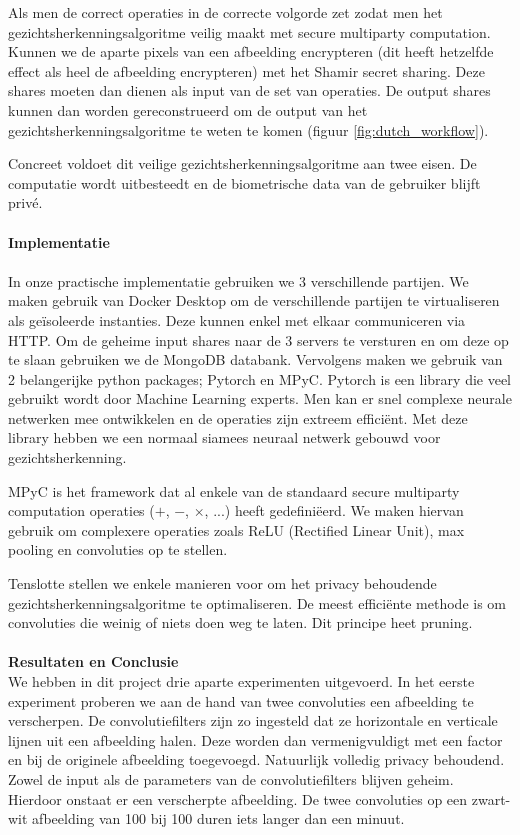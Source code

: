 Als men de correct operaties in de correcte volgorde zet zodat men het gezichtsherkenningsalgoritme veilig maakt met secure multiparty computation. Kunnen we de aparte pixels van een afbeelding encrypteren (dit heeft hetzelfde effect als heel de afbeelding encrypteren) met het Shamir secret sharing. Deze shares moeten dan dienen als input van de set van operaties. De output shares kunnen dan worden gereconstrueerd om de output van het gezichtsherkenningsalgoritme te weten te komen (figuur \ref{fig:dutch_workflow}).

Concreet voldoet dit veilige gezichtsherkenningsalgoritme aan twee eisen. De computatie wordt uitbesteedt en de biometrische data van de gebruiker blijft priv\'e.\\\\

\textbf{\Large{Implementatie}}\\\\
In onze practische implementatie gebruiken we 3 verschillende partijen. We maken gebruik van Docker Desktop om de verschillende partijen te virtualiseren als ge\"isoleerde instanties. Deze kunnen enkel met elkaar communiceren via HTTP. Om de geheime input shares naar de 3 servers te versturen en om deze op te slaan gebruiken we de MongoDB databank. Vervolgens maken we gebruik van 2 belangerijke python packages; Pytorch en MPyC. Pytorch is een library die veel gebruikt wordt door Machine Learning experts. Men kan er snel complexe neurale netwerken mee ontwikkelen en de operaties zijn extreem effici\"ent. Met deze library hebben we een normaal siamees neuraal netwerk gebouwd voor gezichtsherkenning.

MPyC is het framework dat al enkele van de standaard secure multiparty computation operaties ($+$, $-$, $\times$, ...) heeft gedefini\"eerd. We maken hiervan gebruik om complexere operaties zoals ReLU (Rectified Linear Unit), max pooling en convoluties op te stellen.

Tenslotte stellen we enkele manieren voor om het privacy behoudende gezichtsherkenningsalgoritme te optimaliseren. De meest effici\"ente methode is om convoluties die weinig of niets doen weg te laten. Dit principe heet pruning.\\\\

\textbf{\Large{Resultaten en Conclusie}}\\
We hebben in dit project drie aparte experimenten uitgevoerd. In het eerste experiment proberen we aan de hand van twee convoluties een afbeelding te verscherpen. De convolutiefilters zijn zo ingesteld dat ze horizontale en verticale lijnen uit een afbeelding halen. Deze worden dan vermenigvuldigt met een factor en bij de originele afbeelding toegevoegd. Natuurlijk volledig privacy behoudend. Zowel de input als de parameters van de convolutiefilters blijven geheim. Hierdoor onstaat er een verscherpte afbeelding. De twee convoluties op een zwart-wit afbeelding van 100 bij 100 duren iets langer dan een minuut.


